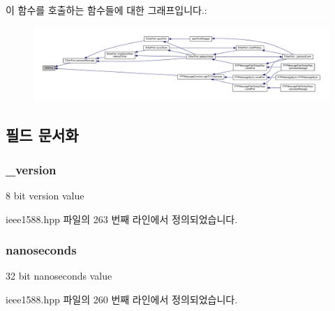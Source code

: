 이 함수를 호출하는 함수들에 대한 그래프입니다.\+:
\nopagebreak
\begin{figure}[H]
\begin{center}
\leavevmode
\includegraphics[width=350pt]{class_timestamp_a3f23c97b6c9f2a88e1121d1c633ccafa_icgraph}
\end{center}
\end{figure}




\subsection{필드 문서화}
\subsubsection[{\texorpdfstring{\+\_\+version}{_version}}]{ \+\_\+version}\hypertarget{class_timestamp_a8fab72cfd922b5757580642c2309e9bd}{}\label{class_timestamp_a8fab72cfd922b5757580642c2309e9bd}


8 bit version value 



ieee1588.\+hpp 파일의 263 번째 라인에서 정의되었습니다.

\subsubsection[{\texorpdfstring{nanoseconds}{nanoseconds}}]{ nanoseconds}\hypertarget{class_timestamp_a78ae11d98fcfe738239d0a853d82c84a}{}\label{class_timestamp_a78ae11d98fcfe738239d0a853d82c84a}


32 bit nanoseconds value 



ieee1588.\+hpp 파일의 260 번째 라인에서 정의되었습니다.

